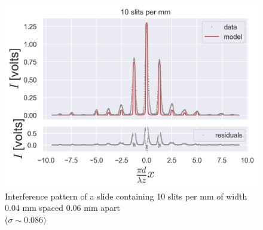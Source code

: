 \begin{figure}[H]
    \includegraphics[width=0.9\columnwidth]{figures/10 slits per mm with residuals.png}
    \caption{Interference pattern of a slide containing 10 slits per mm of width 0.04 mm spaced 0.06 mm apart\\
    ($\sigma\sim0.086)$}
    \label{fig:10 slits per mm}
\end{figure}